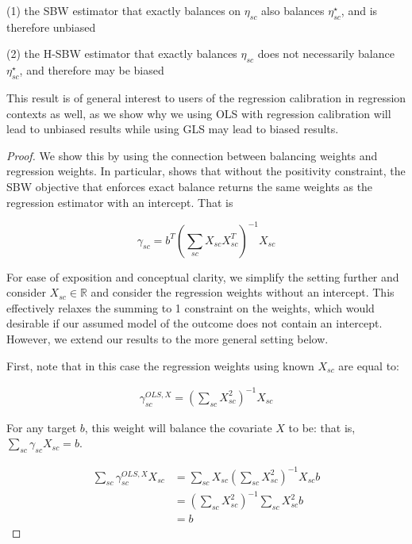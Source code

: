 \begin{proposition}
(1) the SBW estimator that exactly balances on $\eta_{sc}$ also balances $\eta^\star_{sc}$, and is therefore unbiased 

(2) the H-SBW estimator that exactly balances $\eta_{sc}$ does not necessarily balance $\eta^\star_{sc}$, and therefore may be biased
\end{proposition}

\begin{remark}
This result is of general interest to users of the regression calibration in regression contexts as well, as we show why we using OLS with regression calibration will lead to unbiased results while using GLS may lead to biased results. 
\end{remark}

\begin{proof}
We show this by using the connection between balancing weights and regression weights. In particular, \cite{chattopadhyay2021implied} shows that without the positivity constraint, the SBW objective that enforces exact balance returns the same weights as the regression estimator with an intercept. That is

$$
\gamma_{sc} = b^T(\sum_{sc} X_{sc} X_{sc}^T)^{-1}X_{sc}
$$

For ease of exposition and conceptual clarity, we simplify the setting further and consider $X_{sc} \in \mathbb{R}$ and consider the regression weights without an intercept. This effectively relaxes the summing to 1 constraint on the weights, which would desirable if our assumed model of the outcome does not contain an intercept. However, we extend our results to the more general setting below.

First, note that in this case the regression weights using known $X_{sc}$ are equal to:

\begin{align*}
    \gamma_{sc}^{OLS, X} = (\sum_{sc}X_{sc}^2)^{-1}X_{sc}
\end{align*}


For any target $b$, this weight will balance the covariate $X$ to be: that is, $\sum_{sc}\gamma_{sc}X_{sc} = b$.

    \begin{align*}
        \sum_{sc} \gamma_{sc}^{OLS, X} X_{sc} &= \sum_{sc} X_{sc} (\sum_{sc} X_{sc}^2)^{-1}X_{sc}b \\
        &= (\sum_{sc} X_{sc}^2)^{-1}\sum_{sc} X_{sc}^2b \\
        &= b
    \end{align*}


\end{proof}

